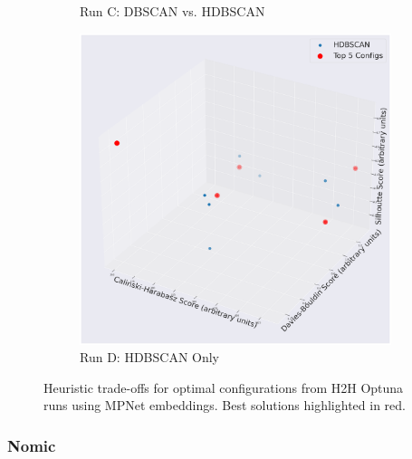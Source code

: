 \documentclass[10pt,oneside]{report}
\begin{document}
\begin{figure}[H]
\begin{subfigure}[b]{0.48\textwidth}
        \caption{Run C: DBSCAN vs. HDBSCAN}
        \label{fig:mpnet_dbscan_vs_hdbscan_h2h_config}
    \end{subfigure}
    \hfill
    \begin{subfigure}[b]{0.48\textwidth}
        \centering
        \includegraphics[width=\textwidth]{./images/mpnet_hdbscan.png}
        \caption{Run D: HDBSCAN Only}
        \label{fig:mpnet_hdbscan_only_h2h_config}
    \end{subfigure}
    \caption{Heuristic trade-offs for optimal configurations from H2H Optuna runs using MPNet embeddings. Best solutions highlighted in red.}
    \label{fig:mpnet_h2h_config_appendix}
\end{figure}

\subsubsection{Nomic}
\end{document}
